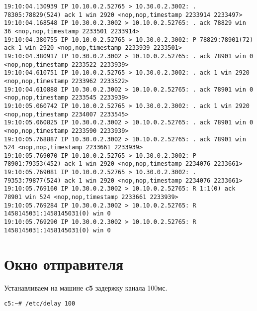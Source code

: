 \documentclass[a4paper,12pt]{article}
\begin{document}
\begin{lstlisting}
19:10:04.130939 IP 10.10.0.2.52765 > 10.30.0.2.3002: . 78305:78829(524) ack 1 win 2920 <nop,nop,timestamp 2233914 2233497>
19:10:04.168548 IP 10.30.0.2.3002 > 10.10.0.2.52765: . ack 78829 win 36 <nop,nop,timestamp 2233501 2233914>
19:10:04.380755 IP 10.10.0.2.52765 > 10.30.0.2.3002: P 78829:78901(72) ack 1 win 2920 <nop,nop,timestamp 2233939 2233501>
19:10:04.380917 IP 10.30.0.2.3002 > 10.10.0.2.52765: . ack 78901 win 0 <nop,nop,timestamp 2233522 2233939>
19:10:04.610751 IP 10.10.0.2.52765 > 10.30.0.2.3002: . ack 1 win 2920 <nop,nop,timestamp 2233962 2233522>
19:10:04.610888 IP 10.30.0.2.3002 > 10.10.0.2.52765: . ack 78901 win 0 <nop,nop,timestamp 2233545 2233939>
19:10:05.060742 IP 10.10.0.2.52765 > 10.30.0.2.3002: . ack 1 win 2920 <nop,nop,timestamp 2234007 2233545>
19:10:05.060825 IP 10.30.0.2.3002 > 10.10.0.2.52765: . ack 78901 win 0 <nop,nop,timestamp 2233590 2233939>
19:10:05.768887 IP 10.30.0.2.3002 > 10.10.0.2.52765: . ack 78901 win 524 <nop,nop,timestamp 2233661 2233939>
19:10:05.769070 IP 10.10.0.2.52765 > 10.30.0.2.3002: P 78901:79353(452) ack 1 win 2920 <nop,nop,timestamp 2234076 2233661>
19:10:05.769081 IP 10.10.0.2.52765 > 10.30.0.2.3002: . 79353:79877(524) ack 1 win 2920 <nop,nop,timestamp 2234076 2233661>
19:10:05.769160 IP 10.30.0.2.3002 > 10.10.0.2.52765: R 1:1(0) ack 78901 win 524 <nop,nop,timestamp 2233661 2233939>
19:10:05.769284 IP 10.30.0.2.3002 > 10.10.0.2.52765: R 1458145031:1458145031(0) win 0
19:10:05.769290 IP 10.30.0.2.3002 > 10.10.0.2.52765: R 1458145031:1458145031(0) win 0
\end{lstlisting}

\section{Окно отправителя}

Устанавливаем на машине \textbf{c5} задержку канала 100мс.

\begin{lstlisting}
c5:~# /etc/delay 100
\end{lstlisting}
\end{document}
